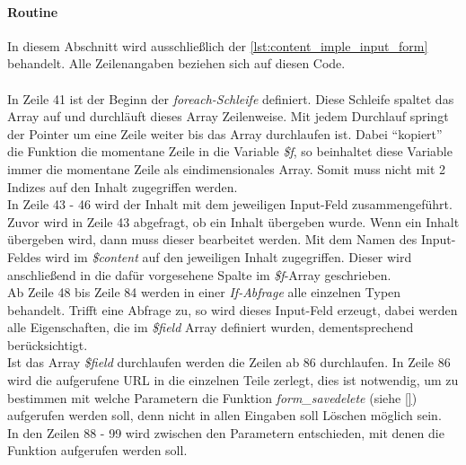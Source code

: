

\paragraph{Routine\\}
In diesem Abschnitt wird ausschließlich der \autoref{lst:content_imple_input_form} behandelt. Alle Zeilenangaben beziehen sich auf diesen Code.\\
\\
In Zeile 41 ist der Beginn der \textit{foreach-Schleife} definiert. Diese Schleife spaltet das Array auf und durchläuft dieses Array Zeilenweise. Mit jedem Durchlauf springt der Pointer um eine Zeile weiter bis das Array durchlaufen ist. Dabei \enquote{kopiert} die Funktion die momentane Zeile in die Variable \textit{\$f}, so beinhaltet diese Variable immer die momentane Zeile als eindimensionales Array. Somit muss nicht mit 2 Indizes auf den Inhalt zugegriffen werden.\\
In Zeile 43 - 46 wird der Inhalt mit dem jeweiligen Input-Feld zusammengeführt. Zuvor wird in Zeile 43 abgefragt, ob ein Inhalt übergeben wurde. Wenn ein Inhalt übergeben wird, dann muss dieser bearbeitet werden. Mit dem Namen des Input-Feldes wird im \textit{\$content} auf den jeweiligen Inhalt zugegriffen. Dieser wird anschließend in die dafür vorgesehene Spalte im \textit{\$f}-Array geschrieben.\\
Ab Zeile 48 bis Zeile 84 werden in einer \textit{If-Abfrage} alle einzelnen Typen behandelt. Trifft eine Abfrage zu, so wird dieses Input-Feld erzeugt, dabei werden alle Eigenschaften, die im \textit{\$field} Array definiert wurden, dementsprechend berücksichtigt.\\
Ist das Array \textit{\$field} durchlaufen werden die Zeilen ab 86 durchlaufen. In Zeile 86 wird die aufgerufene URL in die einzelnen Teile zerlegt, dies ist notwendig, um zu bestimmen mit welche Parametern die Funktion \textit{form\_savedelete} (siehe \autoref{}) aufgerufen werden soll, denn nicht in allen Eingaben soll Löschen möglich sein.\\
In den Zeilen 88 - 99 wird zwischen den Parametern entschieden, mit denen die Funktion aufgerufen werden soll.

